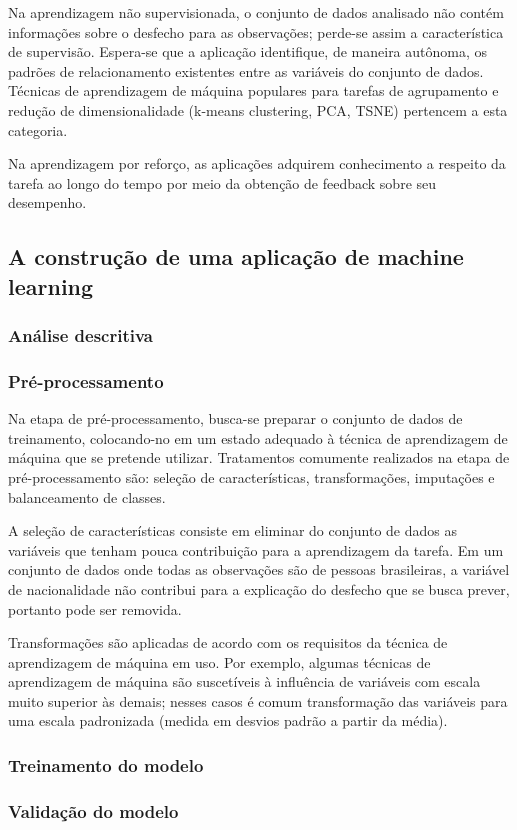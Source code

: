 Na aprendizagem não supervisionada, o conjunto de dados analisado não contém informações sobre o desfecho para
as observações; perde-se assim a característica de supervisão. Espera-se que a aplicação identifique, de maneira
autônoma, os padrões de relacionamento existentes entre as variáveis do conjunto de dados. Técnicas de aprendizagem de
máquina populares para tarefas de agrupamento e redução de dimensionalidade (k-means clustering, PCA, TSNE) pertencem
a esta categoria.

Na aprendizagem por reforço, as aplicações adquirem conhecimento a respeito da tarefa ao longo do tempo por meio da obtenção
de feedback sobre seu desempenho.

\subsection{A construção de uma aplicação de machine learning}
\subsubsection{Análise descritiva}
\subsubsection{Pré-processamento}
Na etapa de pré-processamento, busca-se preparar o conjunto de dados de treinamento, colocando-no em um estado adequado à técnica
de aprendizagem de máquina que se pretende utilizar. Tratamentos comumente realizados na etapa de pré-processamento são: seleção de
características, transformações, imputações e balanceamento de classes.

A seleção de características consiste em eliminar do conjunto de dados as variáveis que tenham pouca contribuição para a aprendizagem da tarefa.
Em um conjunto de dados onde todas as observações são de pessoas brasileiras, a variável de nacionalidade não contribui para a explicação do desfecho
que se busca prever, portanto pode ser removida.

Transformações são aplicadas de acordo com os requisitos da técnica de aprendizagem de máquina em uso. Por exemplo, algumas técnicas de aprendizagem
de máquina são suscetíveis à influência de variáveis com escala muito superior às demais; nesses casos é comum transformação das variáveis para uma escala
padronizada (medida em desvios padrão a partir da média).

\subsubsection{Treinamento do modelo}
\subsubsection{Validação do modelo}
